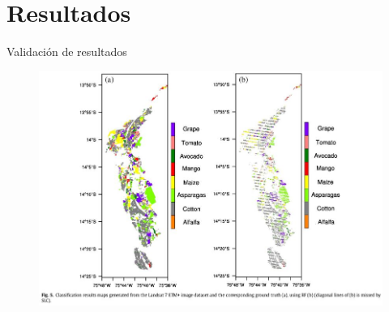 \section{Resultados}


\begin{frame}{Validación de resultados}

\begin{figure}
	\includegraphics[scale=0.4]{imgs/resultado_paper.JPG}\\
	\centering
\end{figure}

\end{frame}

